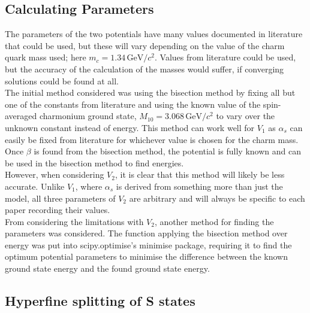 \documentclass[10pt, twocolumn]{article}
\begin{document}
\subsection{Calculating Parameters}
The parameters of the two potentials have many values documented in literature that could be used, but these will vary depending on the value of the charm quark mass used; here $m_c = 1.34\,\text{GeV}/c^2$. 
Values from literature could be used, but the accuracy of the calculation of the masses would suffer, if converging solutions could be found at all.\\
The initial method considered was using the bisection method by fixing all but one of the constants from literature and using the known value of the spin-averaged charmonium ground state, $M_{10} = 3.068\,\text{GeV}/c^2$ to vary over the unknown constant instead of energy.
This method can work well for $V_1$ as $\alpha_s$ can easily be fixed from literature for whichever value is chosen for the charm mass. 
Once $\beta$ is found from the bisection method, the potential is fully known and can be used in the bisection method to find energies. \\
However, when considering $V_2$, it is clear that this method will likely be less accurate.
Unlike $V_1$, where $\alpha_s$ is derived from something more than just the model, all three parameters of $V_2$ are arbitrary and will always be specific to each paper recording their values. \\
From considering the limitations with $V_2$, another method for finding the parameters was considered. 
The function applying the bisection method over energy was put into scipy.optimise's minimise package, requiring it to find the optimum potential parameters to minimise the difference between the known ground state energy and the found ground state energy. 

\subsection{Hyperfine splitting of S states}
\end{document}
